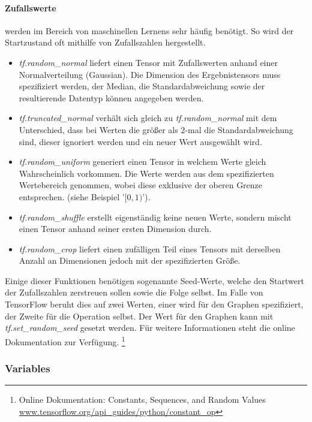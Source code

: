 \paragraph{Zufallswerte} werden im Bereich von maschinellen Lernens sehr häufig benötigt. 
So wird der Startzustand oft mithilfe von Zufallszahlen hergestellt. 

\begin{itemize}
	\item \textit{tf.random\_normal} liefert einen Tensor mit Zufallswerten anhand einer Normalverteilung (Gaussian). 
	Die Dimension des Ergebnistensors muss spezifiziert werden, der Median, die Standardabweichung sowie der resultierende Datentyp können angegeben werden. 
	\item \textit{tf.truncated\_normal} verhält sich gleich zu \textit{tf.random\_normal} mit dem Unterschied, dass bei Werten die größer als $2$-mal die Standardabweichung sind, dieser ignoriert werden und ein neuer Wert ausgewählt wird.
	\item \textit{tf.random\_uniform} generiert einen Tensor in welchem Werte gleich Wahrscheinlich vorkommen.
	Die Werte werden aus dem spezifizierten Wertebereich genommen, wobei diese exklusive der oberen Grenze entsprechen. (siehe Beispiel '$[0, 1)$').
	\item \textit{tf.random\_shuffle} erstellt eigenständig keine neuen Werte, sondern mischt einen Tensor anhand seiner ersten Dimension durch. 
	\item \textit{tf.random\_crop} liefert einen zufälligen Teil eines Tensors mit derselben Anzahl an Dimensionen jedoch mit der spezifizierten Größe.
\end{itemize} \phantom \newline

\noindent
Einige dieser Funktionen benötigen sogenannte Seed-Werte, welche den Startwert der Zufallszahlen zerstreuen sollen sowie die Folge selbst. 
Im Falle von TensorFlow beruht dies auf zwei Werten, einer wird für den Graphen spezifiziert, der Zweite für die Operation selbst. 
Der Wert für den Graphen kann mit \textit{tf.set\_random\_seed} gesetzt werden. 
Für weitere Informationen steht die online Dokumentation zur Verfügung. \footnote{Online Dokumentation: Constants, Sequences, and Random Values  \url{www.tensorflow.org/api_guides/python/constant_op}}

\subsubsection{Variables}


